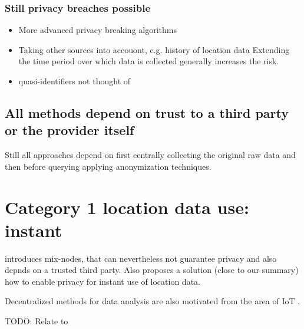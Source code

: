 \subsubsection{Still privacy breaches possible}
\begin{itemize}
	\item More advanced privacy breaking algorithms
\item Taking other sources into accouont, e.g. history of location data
Extending the time period over which data is collected generally increases the risk.

\item quasi-identifiers not thought of
\end{itemize}
\subsection{All methods depend on trust to a third party or the provider itself}
Still all approaches depend on first centrally collecting the original raw data and then before querying \parencite{k-anonymity} applying anonymization techniques.

\section{Category 1 location data use: instant}
\parencite{location-privacy, mix-zones} introduces mix-nodes, that can nevertheless not guarantee privacy and also depnds on a trusted third party.
		Also \parencite{casper} proposes a solution (close to our summary) how to enable privacy for instant use of location data.

Decentralized methods for data analysis are also motivated from the area of IoT \parencite{iot}.

TODO: Relate to \parencite{k-anonymity}

